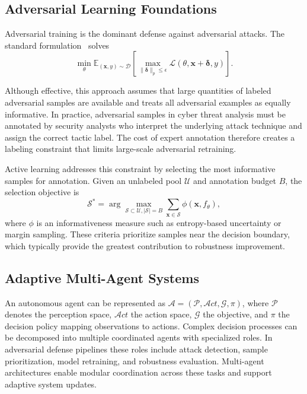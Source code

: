 \documentclass[review,1p,times,number]{elsarticle}
\begin{document}
\subsection{Adversarial Learning Foundations}
\label{subsec:foundations}

Adversarial training is the dominant defense against adversarial
attacks. The standard formulation~\cite{madry2018towards} solves
\begin{equation}
\min_\theta
\mathbb{E}_{(\mathbf{x},y)\sim\mathcal{D}}
\left[
  \max_{\|\boldsymbol{\delta}\|_p\leq\epsilon}
  \mathcal{L}(\theta,\mathbf{x}+\boldsymbol{\delta},y)
\right].
\label{eq:adv_train}
\end{equation}

Although effective, this approach assumes that large quantities of
labeled adversarial samples are available and treats all adversarial
examples as equally informative. In practice, adversarial samples in
cyber threat analysis must be annotated by security analysts who
interpret the underlying attack technique and assign the correct
tactic label. The cost of expert annotation therefore creates a
labeling constraint that limits large-scale adversarial retraining.

Active learning addresses this constraint by selecting the most
informative samples for annotation. Given an unlabeled pool
$\mathcal{U}$ and annotation budget $B$, the selection objective is
\begin{equation}
\mathcal{S}^* =
\arg\max_{\mathcal{S}\subset\mathcal{U},|\mathcal{S}|=B}
\sum_{\mathbf{x}\in\mathcal{S}} \phi(\mathbf{x},f_\theta),
\label{eq:al_general}
\end{equation}
where $\phi$ is an informativeness measure such as entropy-based
uncertainty or margin sampling. These criteria prioritize samples
near the decision boundary, which typically provide the greatest
contribution to robustness improvement.

\subsection{Adaptive Multi-Agent Systems}
\label{subsec:agents}

An autonomous agent can be represented as
$\mathcal{A}=(\mathcal{P},\mathcal{A}ct,\mathcal{G},\pi)$, where
$\mathcal{P}$ denotes the perception space, $\mathcal{A}ct$ the
action space, $\mathcal{G}$ the objective, and $\pi$ the decision
policy mapping observations to actions. Complex decision processes
can be decomposed into multiple coordinated agents with specialized
roles. In adversarial defense pipelines these roles include attack
detection, sample prioritization, model retraining, and robustness
evaluation. Multi-agent architectures enable modular coordination
across these tasks and support adaptive system updates.
\end{document}
